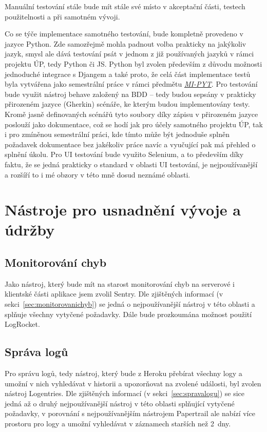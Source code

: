 Manuální testování stále bude mít stále své místo v akceptační části, testech použitelnosti a při samotném vývoji.

Co se týče implementace samotného testování, bude kompletně provedeno v jazyce Python. Zde samozřejmě mohla padnout volba prakticky na jakýkoliv jazyk, smysl ale dává testování psát v jednom z již používaných jazyků v rámci projektu ÚP, tedy Python či JS. Python byl zvolen především z důvodu možnosti jednoduché integrace s Djangem a také proto, že celá část implementace testů byla vytvářena jako semestrální práce v rámci předmětu \textit{\href{https://courses.fit.cvut.cz/MI-PYT/}{MI-PYT}}. Pro testování bude využit nástroj behave založený na BDD -- tedy budou sepsány v prakticky přirozeném jazyce (Gherkin) scénáře, ke kterým budou implementovány testy. Kromě jasně definovaných scénářů tyto soubory díky zápisu v přirozeném jazyce poslouží jako dokumentace, což se hodí jak pro účely samotného projektu ÚP, tak i pro zmíněnou semestrální práci, kde tímto může být jednoduše splněn požadavek dokumentace bez jakékoliv práce navíc a vyučující pak má přehled o splnění úkolu. Pro UI testování bude využito Selenium, a to především díky faktu, že se jedná prakticky o standard v oblasti UI testování, je nejpoužívanější a rozšíří to i mé obzory v této mně dosud neznámé oblasti.

\section{Nástroje pro usnadnění vývoje a údržby}

\subsection{Monitorování chyb}

Jako nástroj, který bude mít na starost monitorování chyb na serverové i klientské části aplikace jsem zvolil Sentry. Dle zjištěných informací (v sekci~\ref{sec:monitorovanichyb}) se jedná o nejpoužívanější nástroj v této oblasti a splňuje všechny vytyčené požadavky. Dále bude prozkoumána možnost použití LogRocket.

\subsection{Správa logů}

Pro správu logů, tedy nástroj, který bude z Heroku přebírat všechny logy a umožní v nich vyhledávat v historii a upozorňovat na zvolené události, byl zvolen nástroj Logentries. Dle zjištěných informací (v sekci~\ref{sec:spravalogu}) se sice jedná až o druhý nejpoužívanější nástroj v této oblasti splňující vytyčené požadavky, v porovnání s nejpoužívanějším nástrojem Papertrail ale nabízí více prostoru pro logy a umožní vyhledávat v záznamech starších než 2~dny.

